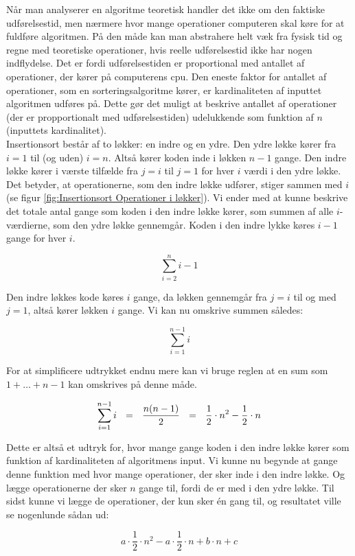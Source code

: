 Når man analyserer en algoritme teoretisk handler det ikke om den faktiske udførelsestid, men nærmere hvor mange operationer computeren skal køre for at fuldføre algoritmen. På den måde kan man abstrahere helt væk fra fysisk tid og regne med teoretiske operationer, hvis reelle udførelsestid ikke har nogen indflydelse. Det er fordi udførelsestiden er proportional med antallet af operationer, der kører på computerens cpu. Den eneste faktor for antallet af operationer, som en sorteringsalgoritme kører, er kardinaliteten af inputtet algoritmen udføres på. Dette gør det muligt at beskrive antallet af operationer (der er propportionalt med udførelsestiden) udelukkende som funktion af $n$ (inputtets kardinalitet). \cite[s. 42]{aogd}\\


Insertionsort består af to løkker: en indre og en ydre. Den ydre løkke kører fra $i = 1$ til (og uden) $i = n$. Altså kører koden inde i løkken $n - 1$ gange. Den indre løkke kører i værste tilfælde fra $j = i$ til $j = 1$ for hver $i$ værdi i den ydre løkke. Det betyder, at operationerne, som den indre løkke udfører, stiger sammen med $i$ (se figur \ref{fig:Insertionsort Operationer i løkker}). Vi ender med at kunne beskrive det totale antal gange som koden i den indre løkke kører, som summen af alle $i$-værdierne, som den ydre løkke gennemgår. Koden i den indre lykke køres $i-1$ gange for hver $i$.

$$\sum_{i=2}^{n}i-1$$

Den indre løkkes kode køres $i$ gange, da løkken gennemgår fra $j=i$ til og med $j=1$, altså kører løkken $i$ gange. Vi kan nu omskrive summen således:

$$\sum_{i=1}^{n-1}i$$

For at simplificere udtrykket endnu mere kan vi bruge reglen at en sum som $1 + \dots + n -1$ kan omskrives på denne måde. 

$$\sum_{i=1}^{n-1}i \:\:\:=\:\:\: \frac{n(n-1)}{2} \:\:\:=\:\:\: \frac{1}{2}\cdot  n^2 - \frac{1}{2}\cdot  n$$

Dette er altså et udtryk for, hvor mange gange koden i den indre løkke kører som funktion af kardinaliteten af algoritmens input. Vi kunne nu begynde at gange denne funktion med hvor mange operationer, der sker inde i den indre løkke. Og lægge operationerne der sker $n$ gange til, fordi de er med i den ydre løkke. Til sidst kunne vi lægge de operationer, der kun sker én gang til, og resultatet ville se nogenlunde sådan ud:

$$a \cdot \frac{1}{2} \cdot n^2 - a \cdot \frac{1}{2} \cdot n + b \cdot n + c$$

